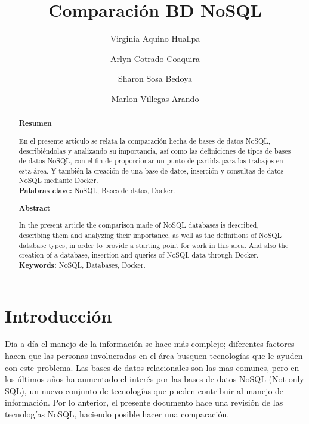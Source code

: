 \documentclass[%
 reprint,
 amsmath,amssymb,
 aps,
]{revtex4-1}
\begin{document}
\title{Comparación BD NoSQL}
\author{Virginia Aquino Huallpa}
\author{Arlyn Cotrado Coaquira}
\author{Sharon Sosa Bedoya}
\author{Marlon Villegas Arando}
%


\begin{abstract}
\begin{center}
\textbf{Resumen}
\end{center}

En el presente articulo se relata la comparación hecha de bases de datos NoSQL, describiéndolas y analizando su importancia, así como las definiciones de tipos de bases de datos NoSQL, con el fin de proporcionar un punto de partida para los trabajos en esta área. Y también la creación de una base de datos, inserción y consultas de datos NoSQL mediante Docker.\\

\textbf{Palabras clave:}   NoSQL, Bases de datos, Docker.\\

\begin{center}
\textbf{Abstract}
\end{center}
In the present article the comparison made of NoSQL databases is described, describing them and analyzing their importance, as well as the definitions of NoSQL database types, in order to provide a starting point for work in this area. And also the creation of a database, insertion and queries of NoSQL data through Docker.\\
\textbf{Keywords:}  NoSQL, Databases, Docker.\\

\end{abstract}



\maketitle


\section {Introducción}\label{sec:1}

Dia a día el manejo de la información se hace más complejo; diferentes factores hacen que las personas involucradas en el área busquen tecnologías que le ayuden con este problema. Las bases de datos relacionales son las mas comunes, pero en los últimos años ha aumentado el interés por las bases de datos NoSQL (Not only SQL), un nuevo conjunto de tecnologías que pueden contribuir al manejo de información.
Por lo anterior, el presente documento hace una revisión de las tecnologías NoSQL, haciendo posible hacer una comparación.\\
\end{document}
